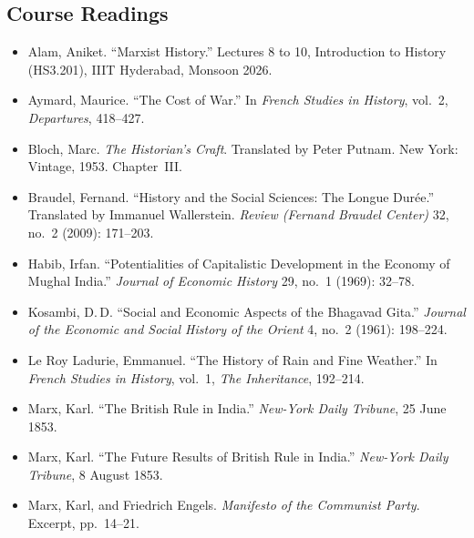 \documentclass[11pt,a4paper]{article}
\begin{document}
\subsection*{Course Readings}
\begin{itemize}
\item Alam, Aniket. \enquote{Marxist History.} Lectures 8 to 10, Introduction to History (HS3.201), IIIT Hyderabad, Monsoon 2026.
\item Aymard, Maurice. \enquote{The Cost of War.} In \emph{French Studies in History}, vol.~2, \emph{Departures}, 418--427.
\item Bloch, Marc. \emph{The Historian's Craft}. Translated by Peter Putnam. New York: Vintage, 1953. Chapter~III.
\item Braudel, Fernand. \enquote{History and the Social Sciences: The Longue Durée.} Translated by Immanuel Wallerstein. \emph{Review (Fernand Braudel Center)} 32, no.~2 (2009): 171--203.
\item Habib, Irfan. \enquote{Potentialities of Capitalistic Development in the Economy of Mughal India.} \emph{Journal of Economic History} 29, no.~1 (1969): 32--78.
\item Kosambi, D.\,D. \enquote{Social and Economic Aspects of the Bhagavad Gita.} \emph{Journal of the Economic and Social History of the Orient} 4, no.~2 (1961): 198--224.
\item Le Roy Ladurie, Emmanuel. \enquote{The History of Rain and Fine Weather.} In \emph{French Studies in History}, vol.~1, \emph{The Inheritance}, 192--214.
\item Marx, Karl. \enquote{The British Rule in India.} \emph{New-York Daily Tribune}, 25 June 1853.
\item Marx, Karl. \enquote{The Future Results of British Rule in India.} \emph{New-York Daily Tribune}, 8 August 1853.
\item Marx, Karl, and Friedrich Engels. \emph{Manifesto of the Communist Party}. Excerpt, pp.~14--21.
\end{itemize}
\end{document}
